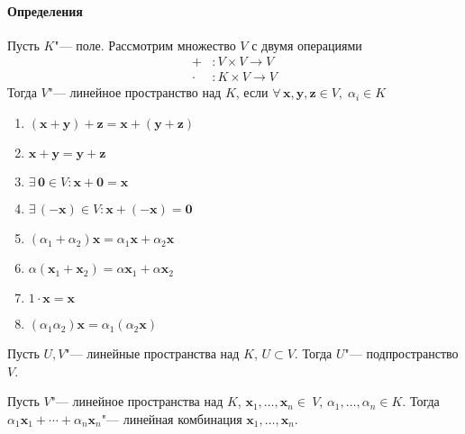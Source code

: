 \documentclass[12pt]{../../notes}
\begin{document}
\setcounter{paragraph}{0}
\paragraph{Определения}
\begin{defn}\label{defn:linspace}
  Пусть $K$"--- поле. Рассмотрим множество  $V$ с двумя операциями
  \begin{align*}  
    + &: V \times V \to V \\
    \cdot &: K\times V \to V
  \end{align*}
  Тогда $V$"--- линейное пространство над $K$, если 
  $\forall\, \mathbf{x},\mathbf{y},\mathbf{z}\in V,\; \alpha_i \in K$
  \begin{enumerate}
    \item $(\mathbf{x}+\mathbf{y}) + \mathbf{z} = \mathbf{x} + (\mathbf{y}+\mathbf{z})$
    \item $\mathbf{x} + \mathbf{y} = \mathbf{y} + \mathbf{z} $
    \item $\exists\, \mathbf{0}\in V : \mathbf{x} + \mathbf{0} = \mathbf{x}$
    \item $\exists\, (-\mathbf{x})\in V : \mathbf{x} + (-\mathbf{x}) = \mathbf{0}$
    \item $(\alpha_1+\alpha_2) \mathbf{x} = \alpha_1 \mathbf{x} + \alpha_2 \mathbf{x}$
    \item $\alpha (\mathbf{x}_1 + \mathbf{x}_2) = \alpha \mathbf{x}_1 + \alpha \mathbf{x}_2$
    \item $1 \cdot \mathbf{x} = \mathbf{x}$
    \item $(\alpha_1 \alpha_2) \mathbf{x} = \alpha_1 (\alpha_2 \mathbf{x})$
  \end{enumerate}
\end{defn}

{ \label{defn:linsubspace}
  Пусть $U,V$"--- линейные пространства над $K$, $U \subset V$. Тогда $U$"--- подпространство 
  $V$.
}

{ \label{defn:lincomb}
Пусть $V$"--- линейное пространства над $K$, $\mathbf{x}_1, \dotsc, \mathbf{x}_n\in~V$, 
$\alpha_1, \dotsc, \alpha_n \in K$. Тогда $\alpha_1 \mathbf{x}_1 + \dotsb + \alpha_n \mathbf{x}_n$"--- 
линейная комбинация $\mathbf{x}_1, \dotsc, \mathbf{x}_n$.
}
\end{document}
